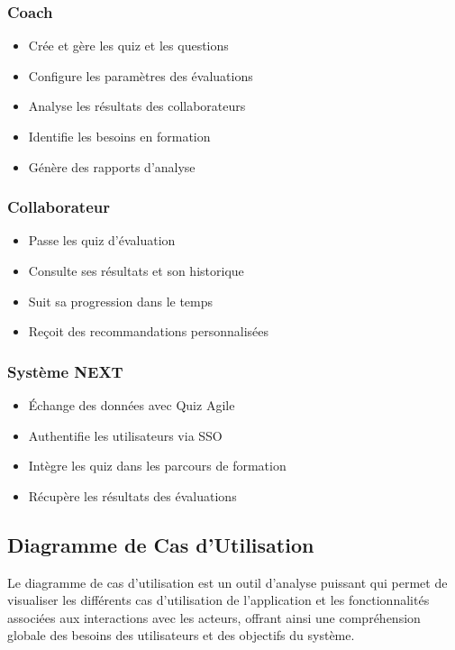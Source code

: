 \documentclass[12pt,a4paper]{report}
\begin{document}
\subsubsection{Coach}

\begin{itemize}
\item Crée et gère les quiz et les questions
\item Configure les paramètres des évaluations
\item Analyse les résultats des collaborateurs
\item Identifie les besoins en formation
\item Génère des rapports d'analyse
\end{itemize}

\subsubsection{Collaborateur}

\begin{itemize}
\item Passe les quiz d'évaluation
\item Consulte ses résultats et son historique
\item Suit sa progression dans le temps
\item Reçoit des recommandations personnalisées
\end{itemize}

\subsubsection{Système NEXT}

\begin{itemize}
\item Échange des données avec Quiz Agile
\item Authentifie les utilisateurs via SSO
\item Intègre les quiz dans les parcours de formation
\item Récupère les résultats des évaluations
\end{itemize}

\subsection{Diagramme de Cas d'Utilisation}

Le diagramme de cas d'utilisation est un outil d'analyse puissant qui permet de visualiser les différents cas d'utilisation de l'application et les fonctionnalités associées aux interactions avec les acteurs, offrant ainsi une compréhension globale des besoins des utilisateurs et des objectifs du système.
\end{document}

